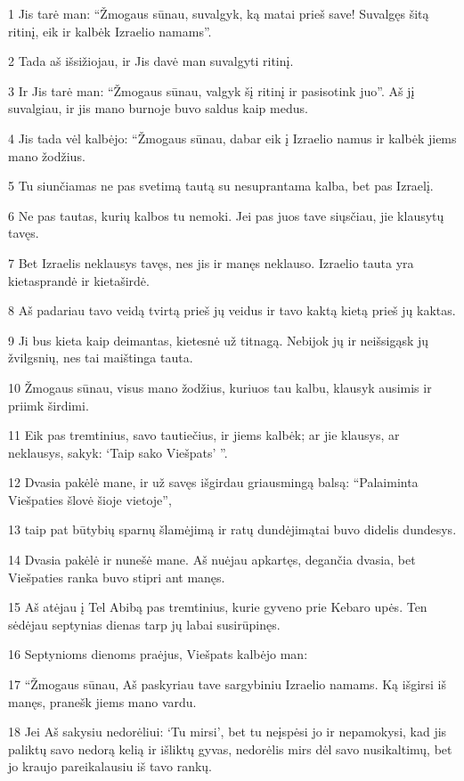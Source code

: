 \par 1 Jis tarė man: “Žmogaus sūnau, suvalgyk, ką matai prieš save! Suvalgęs šitą ritinį, eik ir kalbėk Izraelio namams”. 
\par 2 Tada aš išsižiojau, ir Jis davė man suvalgyti ritinį. 
\par 3 Ir Jis tarė man: “Žmogaus sūnau, valgyk šį ritinį ir pasisotink juo”. Aš jį suvalgiau, ir jis mano burnoje buvo saldus kaip medus. 
\par 4 Jis tada vėl kalbėjo: “Žmogaus sūnau, dabar eik į Izraelio namus ir kalbėk jiems mano žodžius. 
\par 5 Tu siunčiamas ne pas svetimą tautą su nesuprantama kalba, bet pas Izraelį. 
\par 6 Ne pas tautas, kurių kalbos tu nemoki. Jei pas juos tave siųsčiau, jie klausytų tavęs. 
\par 7 Bet Izraelis neklausys tavęs, nes jis ir manęs neklauso. Izraelio tauta yra kietasprandė ir kietaširdė. 
\par 8 Aš padariau tavo veidą tvirtą prieš jų veidus ir tavo kaktą kietą prieš jų kaktas. 
\par 9 Ji bus kieta kaip deimantas, kietesnė už titnagą. Nebijok jų ir neišsigąsk jų žvilgsnių, nes tai maištinga tauta. 
\par 10 Žmogaus sūnau, visus mano žodžius, kuriuos tau kalbu, klausyk ausimis ir priimk širdimi. 
\par 11 Eik pas tremtinius, savo tautiečius, ir jiems kalbėk; ar jie klausys, ar neklausys, sakyk: ‘Taip sako Viešpats’ ”. 
\par 12 Dvasia pakėlė mane, ir už savęs išgirdau griausmingą balsą: “Palaiminta Viešpaties šlovė šioje vietoje”, 
\par 13 taip pat būtybių sparnų šlamėjimą ir ratų dundėjimą­tai buvo didelis dundesys. 
\par 14 Dvasia pakėlė ir nunešė mane. Aš nuėjau apkartęs, degančia dvasia, bet Viešpaties ranka buvo stipri ant manęs. 
\par 15 Aš atėjau į Tel Abibą pas tremtinius, kurie gyveno prie Kebaro upės. Ten sėdėjau septynias dienas tarp jų labai susirūpinęs. 
\par 16 Septynioms dienoms praėjus, Viešpats kalbėjo man: 
\par 17 “Žmogaus sūnau, Aš paskyriau tave sargybiniu Izraelio namams. Ką išgirsi iš manęs, pranešk jiems mano vardu. 
\par 18 Jei Aš sakysiu nedorėliui: ‘Tu mirsi’, bet tu neįspėsi jo ir nepamokysi, kad jis paliktų savo nedorą kelią ir išliktų gyvas, nedorėlis mirs dėl savo nusikaltimų, bet jo kraujo pareikalausiu iš tavo rankų. 
